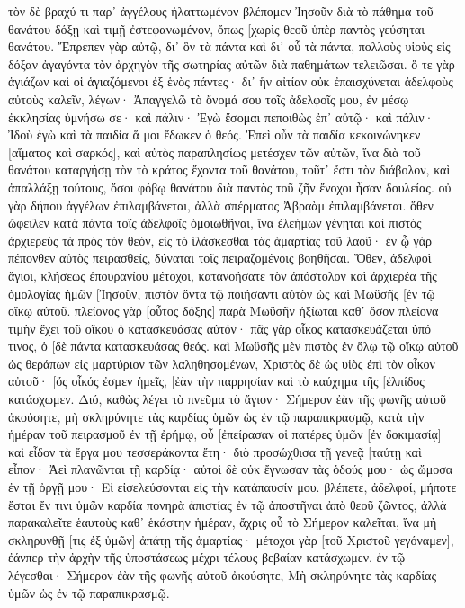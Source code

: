 τὸν δὲ βραχύ τι παρ᾽ ἀγγέλους ἠλαττωμένον βλέπομεν Ἰησοῦν διὰ τὸ πάθημα τοῦ θανάτου δόξῃ καὶ τιμῇ ἐστεφανωμένον, ὅπως [χωρὶς θεοῦ ὑπὲρ παντὸς γεύσηται θανάτου. 
Ἔπρεπεν γὰρ αὐτῷ, δι᾽ ὃν τὰ πάντα καὶ δι᾽ οὗ τὰ πάντα, πολλοὺς υἱοὺς εἰς δόξαν ἀγαγόντα τὸν ἀρχηγὸν τῆς σωτηρίας αὐτῶν διὰ παθημάτων τελειῶσαι. 
ὅ τε γὰρ ἁγιάζων καὶ οἱ ἁγιαζόμενοι ἐξ ἑνὸς πάντες· δι᾽ ἣν αἰτίαν οὐκ ἐπαισχύνεται ἀδελφοὺς αὐτοὺς καλεῖν, 
λέγων· Ἀπαγγελῶ τὸ ὄνομά σου τοῖς ἀδελφοῖς μου, ἐν μέσῳ ἐκκλησίας ὑμνήσω σε· 
καὶ πάλιν· Ἐγὼ ἔσομαι πεποιθὼς ἐπ᾽ αὐτῷ· καὶ πάλιν· Ἰδοὺ ἐγὼ καὶ τὰ παιδία ἅ μοι ἔδωκεν ὁ θεός. 
Ἐπεὶ οὖν τὰ παιδία κεκοινώνηκεν [αἵματος καὶ σαρκός], καὶ αὐτὸς παραπλησίως μετέσχεν τῶν αὐτῶν, ἵνα διὰ τοῦ θανάτου καταργήσῃ τὸν τὸ κράτος ἔχοντα τοῦ θανάτου, τοῦτ᾽ ἔστι τὸν διάβολον, 
καὶ ἀπαλλάξῃ τούτους, ὅσοι φόβῳ θανάτου διὰ παντὸς τοῦ ζῆν ἔνοχοι ἦσαν δουλείας. 
οὐ γὰρ δήπου ἀγγέλων ἐπιλαμβάνεται, ἀλλὰ σπέρματος Ἀβραὰμ ἐπιλαμβάνεται. 
ὅθεν ὤφειλεν κατὰ πάντα τοῖς ἀδελφοῖς ὁμοιωθῆναι, ἵνα ἐλεήμων γένηται καὶ πιστὸς ἀρχιερεὺς τὰ πρὸς τὸν θεόν, εἰς τὸ ἱλάσκεσθαι τὰς ἁμαρτίας τοῦ λαοῦ· 
ἐν ᾧ γὰρ πέπονθεν αὐτὸς πειρασθείς, δύναται τοῖς πειραζομένοις βοηθῆσαι. 
Ὅθεν, ἀδελφοὶ ἅγιοι, κλήσεως ἐπουρανίου μέτοχοι, κατανοήσατε τὸν ἀπόστολον καὶ ἀρχιερέα τῆς ὁμολογίας ἡμῶν [Ἰησοῦν, 
πιστὸν ὄντα τῷ ποιήσαντι αὐτὸν ὡς καὶ Μωϋσῆς [ἐν τῷ οἴκῳ αὐτοῦ. 
πλείονος γὰρ [οὗτος δόξης] παρὰ Μωϋσῆν ἠξίωται καθ᾽ ὅσον πλείονα τιμὴν ἔχει τοῦ οἴκου ὁ κατασκευάσας αὐτόν· 
πᾶς γὰρ οἶκος κατασκευάζεται ὑπό τινος, ὁ [δὲ πάντα κατασκευάσας θεός. 
καὶ Μωϋσῆς μὲν πιστὸς ἐν ὅλῳ τῷ οἴκῳ αὐτοῦ ὡς θεράπων εἰς μαρτύριον τῶν λαληθησομένων, 
Χριστὸς δὲ ὡς υἱὸς ἐπὶ τὸν οἶκον αὐτοῦ· [ὅς οἶκός ἐσμεν ἡμεῖς, [ἐὰν τὴν παρρησίαν καὶ τὸ καύχημα τῆς [ἐλπίδος κατάσχωμεν. 
Διό, καθὼς λέγει τὸ πνεῦμα τὸ ἅγιον· Σήμερον ἐὰν τῆς φωνῆς αὐτοῦ ἀκούσητε, 
μὴ σκληρύνητε τὰς καρδίας ὑμῶν ὡς ἐν τῷ παραπικρασμῷ, κατὰ τὴν ἡμέραν τοῦ πειρασμοῦ ἐν τῇ ἐρήμῳ, 
οὗ [ἐπείρασαν οἱ πατέρες ὑμῶν [ἐν δοκιμασίᾳ] καὶ εἶδον τὰ ἔργα μου 
τεσσεράκοντα ἔτη· διὸ προσώχθισα τῇ γενεᾷ [ταύτῃ καὶ εἶπον· Ἀεὶ πλανῶνται τῇ καρδίᾳ· αὐτοὶ δὲ οὐκ ἔγνωσαν τὰς ὁδούς μου· 
ὡς ὤμοσα ἐν τῇ ὀργῇ μου· Εἰ εἰσελεύσονται εἰς τὴν κατάπαυσίν μου. 
βλέπετε, ἀδελφοί, μήποτε ἔσται ἔν τινι ὑμῶν καρδία πονηρὰ ἀπιστίας ἐν τῷ ἀποστῆναι ἀπὸ θεοῦ ζῶντος, 
ἀλλὰ παρακαλεῖτε ἑαυτοὺς καθ᾽ ἑκάστην ἡμέραν, ἄχρις οὗ τὸ Σήμερον καλεῖται, ἵνα μὴ σκληρυνθῇ [τις ἐξ ὑμῶν] ἀπάτῃ τῆς ἁμαρτίας· 
μέτοχοι γὰρ [τοῦ Χριστοῦ γεγόναμεν], ἐάνπερ τὴν ἀρχὴν τῆς ὑποστάσεως μέχρι τέλους βεβαίαν κατάσχωμεν. 
ἐν τῷ λέγεσθαι· Σήμερον ἐὰν τῆς φωνῆς αὐτοῦ ἀκούσητε, Μὴ σκληρύνητε τὰς καρδίας ὑμῶν ὡς ἐν τῷ παραπικρασμῷ. 

